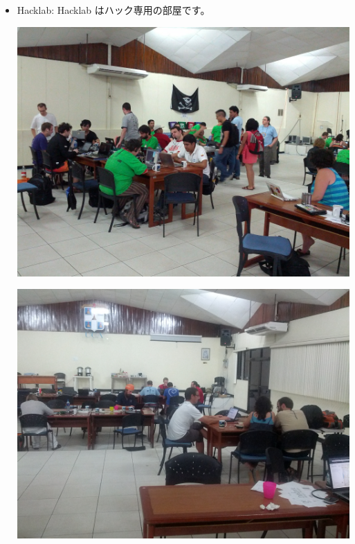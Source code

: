 \documentclass[mingoth,a4paper]{jsarticle}
\begin{document}
\begin{itemize}
  \item Hacklab: Hacklab はハック専用の部屋です。\\
	\begin{minipage}{0.4\hsize}
	\includegraphics[width=0.8\hsize]{image201208/debconf12_hacklab01.jpg}
	\end{minipage}
        \begin{minipage}{0.4\hsize}
        \includegraphics[width=0.8\hsize]{image201208/debconf12_hacklab02.jpg}
	\end{minipage}


\end{itemize}
\end{document}
